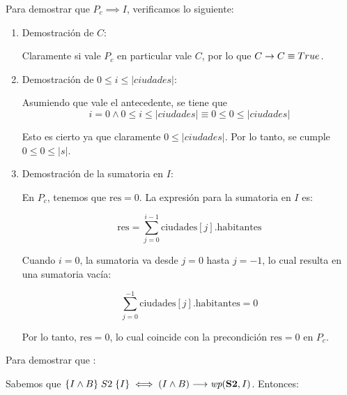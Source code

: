 \documentclass[10pt,a4paper]{article}
\begin{document}
Para demostrar que \( P_c \implies I \), verificamos lo siguiente:

\begin{enumerate}
	\item Demostración de $C$:

	      Claramente si vale $P_c$ en particular vale $C$, por lo que $C \rightarrow C \equiv True$.

	\item Demostración de \( 0 \leq i \leq |ciudades| \):

	      Asumiendo que vale el antecedente, se tiene que
	      \[
		      i = 0 \land 0 \leq i \leq |ciudades| \equiv 0 \leq 0 \leq |ciudades|
	      \]

	      Esto es cierto ya que claramente \( 0 \leq |ciudades| \). Por lo tanto, se cumple \( 0 \leq 0 \leq |s| \).

	\item Demostración de la sumatoria en \( I \):

	      En \( P_c \), tenemos que \( \text{res} = 0 \). La expresión para la sumatoria en \( I \) es:

	      \[
		      \text{res} = \sum_{j=0}^{i-1} \text{ciudades}[j].\text{habitantes}
	      \]

	      Cuando \( i = 0 \), la sumatoria va desde \( j = 0 \) hasta \( j = -1 \), lo cual resulta en una sumatoria vacía:

	      \[
		      \sum_{j=0}^{-1} \text{ciudades}[j].\text{habitantes} = 0
	      \]

	      Por lo tanto, \( \text{res} = 0 \), lo cual coincide con la precondición \( \text{res} = 0 \) en \( P_c \).
\end{enumerate}
\pagebreak

Para demostrar que :

Sabemos que $\hoare{I \land B}{S2}{I} \iff (I \land B) \implica \wp{S2}{I}$. Entonces:
\end{document}

